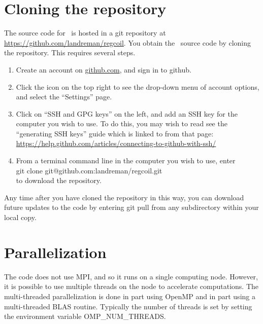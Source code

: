 \section{Cloning the repository}

The source code for \regcoil~is hosted in a {\ttfamily git} repository at
\url{https://github.com/landreman/regcoil}.
You obtain the \regcoil~source code by cloning the repository. This requires several steps.

\begin{enumerate}
\item Create an account on \url{github.com}, and sign in to {\ttfamily github}.
\item Click the icon on the top right to see the drop-down menu of account options, and select the ``Settings'' page.
\item Click on ``SSH and GPG keys'' on the left, and add an SSH key for the computer you wish to use. To do this, you may wish to read see the ``generating SSH keys'' guide which is linked to from that page: \url{https://help.github.com/articles/connecting-to-github-with-ssh/}
\item From a terminal command line in the computer you wish to use, enter\\
{\ttfamily git clone git@github.com:landreman/regcoil.git}\\
 to download the repository.
\end{enumerate}

Any time after you have cloned the repository in this way, you can download future updates to the code by entering {\ttfamily git pull} from any subdirectory within your local copy.



\section{Parallelization}

The code does not use {\ttfamily MPI}, and so it runs on a single computing node.  However, it is possible to use multiple threads
on the node to accelerate computations.  The multi-threaded parallelization is done in part using {\ttfamily OpenMP}
and in part using a multi-threaded {\ttfamily BLAS} routine. Typically the number of threads is set by
setting the environment variable {\ttfamily OMP\_NUM\_THREADS}.


